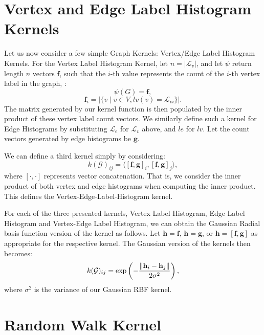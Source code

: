 \section{Vertex and Edge Label Histogram Kernels}
\label{appendix:graph_kernels:histogram}

Let us now consider a few simple Graph Kernels: Vertex/Edge Label Histogram
Kernels. For the Vertex Label Histogram Kernel, let $n=|\mathcal{L}_v|$, and let
$\psi$ return length $n$ vectors $\mathbf{f}$, such that the $i$-th value
represents the count of the $i$-th vertex label in the graph, \ie: 
\begin{equation}
    \psi(G) = \mathbf{f},
\end{equation}
\begin{equation}
    \mathbf{f}_i=|\{v \mid v \in V, lv(v) = \mathcal{L}_{vi}\}|.
\end{equation}
%
The matrix generated by our kernel function is then populated by the inner
product of these vertex label count vectors.
We similarly define such a kernel for Edge Histograms by substituting
$\mathcal{L}_e$ for $\mathcal{L}_v$ above, and $le$ for $lv$. Let the count
vectors generated by edge histograms be $\mathbf{g}$.

We can define a third kernel simply by considering:
\begin{equation}
    k(\mathcal{G})_{ij} = \langle[\mathbf{f},\mathbf{g}]_i, [\mathbf{f},\mathbf{g}]_j\rangle,
\end{equation}
%
where $[\cdot,\cdot]$ represents vector concatenation. That is, we consider the
inner product of both vertex and edge histograms when computing the inner
product. This defines the Vertex-Edge-Label-Histogram kernel.

For each of the three presented kernels, Vertex Label Histogram, Edge Label
Histogram and Vertex-Edge Label Histogram, we can obtain the Gaussian Radial
basis function version of the kernel as follows. Let $\mathbf{h} = \mathbf{f}$,
$\mathbf{h} = \mathbf{g}$, or $\mathbf{h} = \mathbf{[\mathbf{f}, \mathbf{g}]}$
as appropriate for the respective kernel. The Gaussian version of the kernels
then becomes:
\begin{equation}
    k(\mathcal{G})_{ij} = \text{exp}\left(-\frac{\lVert\mathbf{h}_i - \mathbf{h}_j\rVert}{2\sigma^2}\right),
\end{equation}
%
where $\sigma^2$ is the variance of our Gaussian RBF kernel.


\section{Random Walk Kernel}
\label{appendix:graph_kernels:random_walk}

